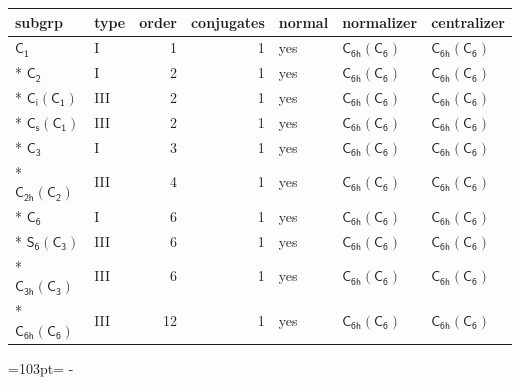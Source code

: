 \documentclass[10pt,a4paper]{article}
\newcommand{\needspace}[1]{\par\penalty-100\begingroup\dimen0=#1\relax\dimen2=\pagegoal
  \advance\dimen2-\pagetotal\ifdim\dimen0>\dimen2\relax\ifdim\dimen2>0pt\vfil\break\fi\fi
  \endgroup}
\numberwithin{equation}{section}
\newcommand{\grp}[1]{\mathsf{#1}}
\begin{document}
{\small\begin{longtable}{@{}llrrlll@{}}\toprule
subgrp & type & order & conjugates & normal & normalizer & centralizer\\\midrule\endhead
\bottomrule\endfoot\endlastfoot
\href{../../../rotation/data/pdf/C1.pdf}{$\grp{C_{1}}$} & I & 1 & 1 & yes & \href{C6h-C6.pdf}{$\grp{C_{6h}}(\grp{C_{6}})$} & \href{C6h-C6.pdf}{$\grp{C_{6h}}(\grp{C_{6}})$}\\*
\href{../../../rotation/data/pdf/C2.pdf}{$\grp{C_{2}}$} & I & 2 & 1 & yes & \href{C6h-C6.pdf}{$\grp{C_{6h}}(\grp{C_{6}})$} & \href{C6h-C6.pdf}{$\grp{C_{6h}}(\grp{C_{6}})$}\\*
\href{S2-C1.pdf}{$\grp{C_{i}}(\grp{C_{1}})$} & III & 2 & 1 & yes & \href{C6h-C6.pdf}{$\grp{C_{6h}}(\grp{C_{6}})$} & \href{C6h-C6.pdf}{$\grp{C_{6h}}(\grp{C_{6}})$}\\*
\href{C1v-C1.pdf}{$\grp{C_{s}}(\grp{C_{1}})$} & III & 2 & 1 & yes & \href{C6h-C6.pdf}{$\grp{C_{6h}}(\grp{C_{6}})$} & \href{C6h-C6.pdf}{$\grp{C_{6h}}(\grp{C_{6}})$}\\*
\href{../../../rotation/data/pdf/C3.pdf}{$\grp{C_{3}}$} & I & 3 & 1 & yes & \href{C6h-C6.pdf}{$\grp{C_{6h}}(\grp{C_{6}})$} & \href{C6h-C6.pdf}{$\grp{C_{6h}}(\grp{C_{6}})$}\\*
\href{C2h-C2.pdf}{$\grp{C_{2h}}(\grp{C_{2}})$} & III & 4 & 1 & yes & \href{C6h-C6.pdf}{$\grp{C_{6h}}(\grp{C_{6}})$} & \href{C6h-C6.pdf}{$\grp{C_{6h}}(\grp{C_{6}})$}\\*
\href{../../../rotation/data/pdf/C6.pdf}{$\grp{C_{6}}$} & I & 6 & 1 & yes & \href{C6h-C6.pdf}{$\grp{C_{6h}}(\grp{C_{6}})$} & \href{C6h-C6.pdf}{$\grp{C_{6h}}(\grp{C_{6}})$}\\*
\href{S6-C3.pdf}{$\grp{S_{6}}(\grp{C_{3}})$} & III & 6 & 1 & yes & \href{C6h-C6.pdf}{$\grp{C_{6h}}(\grp{C_{6}})$} & \href{C6h-C6.pdf}{$\grp{C_{6h}}(\grp{C_{6}})$}\\*
\href{C3h-C3.pdf}{$\grp{C_{3h}}(\grp{C_{3}})$} & III & 6 & 1 & yes & \href{C6h-C6.pdf}{$\grp{C_{6h}}(\grp{C_{6}})$} & \href{C6h-C6.pdf}{$\grp{C_{6h}}(\grp{C_{6}})$}\\*
\href{C6h-C6.pdf}{$\grp{C_{6h}}(\grp{C_{6}})$} & III & 12 & 1 & yes & \href{C6h-C6.pdf}{$\grp{C_{6h}}(\grp{C_{6}})$} & \href{C6h-C6.pdf}{$\grp{C_{6h}}(\grp{C_{6}})$}\\
\bottomrule\end{longtable}}
\needspace{103pt}
\end{document}
